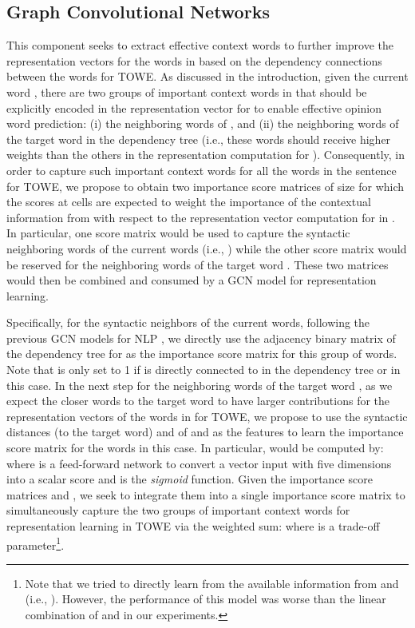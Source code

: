 \documentclass[11pt,a4paper]{article}
\begin{document}
\subsection{Graph Convolutional Networks}
\label{sec:syntax-encoder}



This component seeks to extract effective context words to further improve the representation vectors  for the words in  based on the dependency connections between the words for TOWE. As discussed in the introduction, given the current word , there are two groups of important context words in  that should be explicitly encoded in the representation vector for  to enable effective opinion word prediction: (i) the neighboring words of , and (ii) the neighboring words of the target word  in the dependency tree (i.e., these words should receive higher weights than the others in the representation computation for ). Consequently, in order to capture such important context words for all the words in the sentence for TOWE, we propose to obtain two importance score matrices of size  for which the scores at cells  are expected to weight the importance of the contextual information from  with respect to the representation vector computation for  in . In particular, one score matrix would be used to capture the syntactic neighboring words of the current words (i.e., ) while the other score matrix would be reserved for the neighboring words of the target word . These two matrices would then be combined and consumed by a GCN model \citep{kipf2017semi} for representation learning. 

Specifically, for the syntactic neighbors of the current words, following the previous GCN models for NLP \citep{Marcheggiani:17,Nguyen:18,Veyseh:19b}, we directly use the adjacency binary matrix  of the dependency tree for  as the importance score matrix for this group of words. Note that  is only set to 1 if  is directly connected to  in the dependency tree or  in this case. In the next step for the neighboring words of the target word , as we expect the closer words to the target word  to have larger contributions for the representation vectors of the words in  for TOWE, we propose to use the syntactic distances (to the target word)  and  of  and  as the features to learn the importance score matrix  for the words in this case. In particular,  would be computed by:  where  is a feed-forward network to convert a vector input with five dimensions into a scalar score and  is the {\it sigmoid} function. Given the importance score matrices  and , we seek to integrate them into a single importance score matrix  to simultaneously capture the two groups of important context words for representation learning in TOWE via the weighted sum:  where  is a trade-off parameter\footnote{Note that we tried to directly learn  from the available information from  and  (i.e., ). However, the performance of this model was worse than the linear combination of  and  in our experiments.}.
\end{document}
